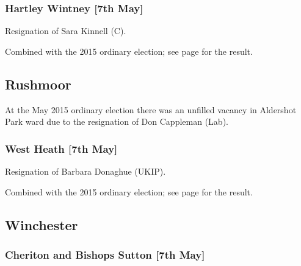 \documentclass[a4paper,openany]{book}
\begin{document}
\begin{resultsiii}
\subsubsection*{Hartley Wintney \hspace*{\fill}\nolinebreak[1]%
\enspace\hspace*{\fill}
[7th May]}


Resignation of Sara Kinnell (C).

Combined with the 2015 ordinary election; see page \pageref{HartleyWintneyHart} for the result.

\subsection*{Rushmoor}

At the May 2015 ordinary election there was an unfilled vacancy in Aldershot Park ward due to the resignation of Don Cappleman (Lab).

\subsubsection*{West Heath \hspace*{\fill}\nolinebreak[1]%
\enspace\hspace*{\fill}
[7th May]}


Resignation of Barbara Donaghue (UKIP).

Combined with the 2015 ordinary election; see page \pageref{WestHeathRushmoor} for the result.

\subsection*{Winchester}

\subsubsection*{Cheriton and Bishops Sutton \hspace*{\fill}\nolinebreak[1]%
\enspace\hspace*{\fill}
[7th May]}



\end{resultsiii}
\end{document}
